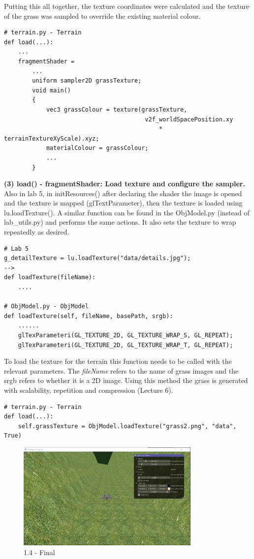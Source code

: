 \documentclass[a4 paper, 12pt]{article}
\begin{document}
Putting this all together, the texture coordinates were calculated and the texture of the grass was sampled to override the existing material colour.
    \begin{lstlisting}
# terrain.py - Terrain
def load(...):
    ...
    fragmentShader =
        ...
        uniform sampler2D grassTexture; 
        void main()
        {
            vec3 grassColour = texture(grassTexture, 
                                        v2f_worldSpacePosition.xy 
                                            * terrainTextureXyScale).xyz;
            materialColour = grassColour;
            ...
        }
    \end{lstlisting}

\textbf{(3) load() - fragmentShader: Load texture and configure the sampler.} \\
Also in lab 5, in initResources() after declaring the shader the image is opened and the texture is mapped (glTextParameter), then the texture is loaded using lu.loadTexture(). A similar function can be found in the ObjModel.py (instead of lab\_utils.py) and performs the same actions. It also sets the texture to wrap repeatedly as desired.
    \begin{lstlisting}  
# Lab 5 
g_detailTexture = lu.loadTexture("data/details.jpg");
--> 
def loadTexture(fileName): 
    ....

# ObjModel.py - ObjModel
def loadTexture(self, fileName, basePath, srgb):
    ......
    glTexParameteri(GL_TEXTURE_2D, GL_TEXTURE_WRAP_S, GL_REPEAT);
    glTexParameteri(GL_TEXTURE_2D, GL_TEXTURE_WRAP_T, GL_REPEAT);
    \end{lstlisting}

To load the texture for the terrain this function needs to be called with the relevant parameters. The \textit{fileName} refers to the name of grass images and the srgb refers to whether it is a 2D image. Using this method the grass is generated with scalability, repetition and compression (Lecture 6).
    \begin{lstlisting}  
# terrain.py - Terrain
def load(...):
    self.grassTexture = ObjModel.loadTexture("grass2.png", "data", True)
    \end{lstlisting}

\begin{figure} [H]
    \centering
    \includegraphics[width=0.8\textwidth, frame]
        {./images/mega_racer/1.4.PNG}
    \caption{1.4 - Final}
\end{figure}
\end{document}
